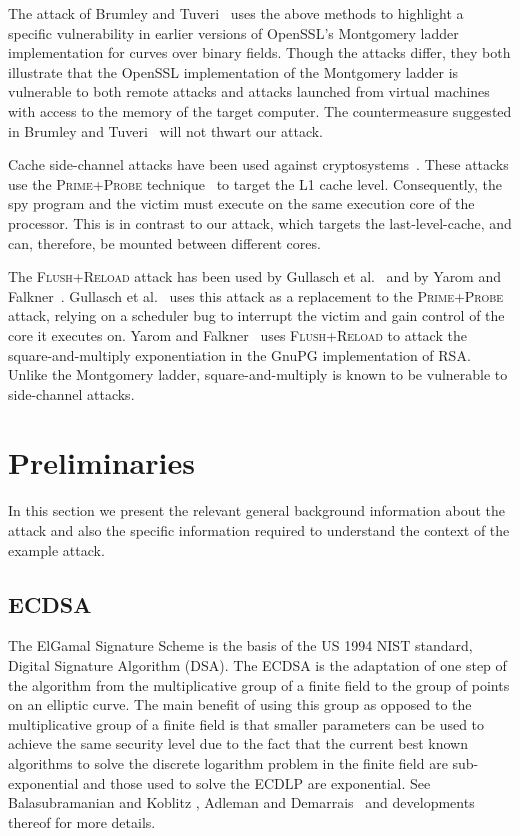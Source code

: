 \documentclass[twocolumn]{svjour3}
\newcommand{\fl}{\textsc{Flu\-sh+\allowbreak Re\-load}\xspace}
\newcommand{\prpr}{\textsc{Prime+\allowbreak Probe}\xspace}
\newcommand{\myupcase}[1]{\uppercase{#1}}
\begin{document}
The attack of Brumley and Tuveri~\cite{brumley11remote} uses the above methods to highlight a specific vulnerability 
in earlier versions of OpenSSL's Montgomery ladder implementation for curves over binary fields.
Though the attacks differ, they both illustrate that the OpenSSL implementation of the Montgomery ladder is vulnerable to  both remote attacks and attacks launched from virtual machines with access to the memory of the target computer. 
The countermeasure suggested in Brumley and Tuveri~\cite{brumley11remote} will not thwart our attack.

Cache side-channel attacks have been used against cryptosystems~\cite{aciicmez07yet,aciicmez10new,brumley09cache,aciicmez08vulnerability,chen13improvement,canteaut06understanding,tromer10efficient,zhang12cross}.
These attacks use the \prpr technique~\cite{tromer10efficient} to target the L1 cache level.
Consequently, the spy program and the victim must execute on the same execution core of the processor.
This is in contrast to our attack, which targets the last-level-cache, and can, therefore, be mounted between different cores.

The \fl attack has been used by Gullasch et al.~\cite{gullasch11cache} and by Yarom and Falkner~\cite{yarom13flush}.
Gullasch et al.~\cite{gullasch11cache} uses this attack as a replacement to the \prpr attack,
relying on a scheduler bug to interrupt the victim and gain control of the core it executes on.
Yarom and Falkner~\cite{yarom13flush} uses \fl to attack the square-and-multiply exponentiation
in the GnuPG implementation of RSA.
Unlike the Montgomery ladder, square-and-multiply is known to be vulnerable to side-channel attacks.

\section{Preliminaries}\label{sec:background}
In this section we present the relevant general background information about the attack and also the specific information required to understand the context of the example attack. %

\subsection{ECDSA}\label{sub:ecdsa}

The ElGamal Signature Scheme \cite{Elgamal85} is the basis of the US 1994 NIST standard, Digital Signature Algorithm (\myupcase{dsa}). The \myupcase{ecdsa} is the adaptation of one step of the algorithm from the multiplicative group of a finite field to the group of points on an elliptic curve. The main benefit of using this group as opposed to the multiplicative group of a finite field is that smaller parameters can be used to achieve the same security level \cite{koblitz87elliptic,miller85use} due to the fact that the current best known algorithms to solve the discrete logarithm problem in the finite field are sub-exponential and those used to solve the \myupcase{ecdlp} are exponential.
See Balasubramanian and Kob\-litz \cite{balasubramanian-koblitz}, Adleman and Demarrais~\cite{adelman-demarrais} and developments thereof for more details. 
\end{document}
